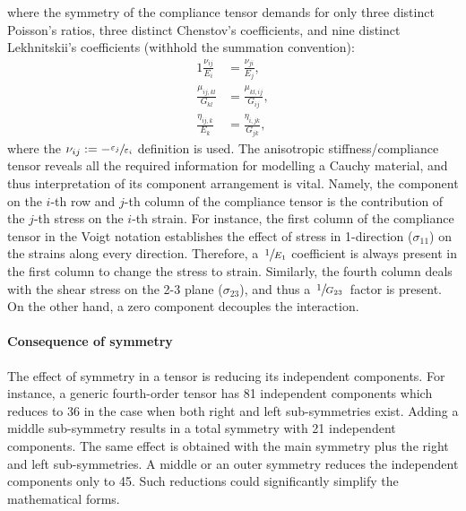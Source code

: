     where the symmetry of the compliance tensor demands for only three distinct Poisson's ratios, three distinct Chenstov's coefficients, and nine distinct Lekhnitskii's coefficients (withhold the summation convention):
    \begin{alignat}{1}
        \frac{\nu_{ij}}{E_i}       &=\frac{\nu_{ji}}{E_j},      \\
        \frac{\mu_{ij,kl}}{G_{kl}} &=\frac{\mu_{kl,ij}}{G_{ij}},\\
        \frac{\eta_{ij,k}}{E_{k}}   &=\frac{\eta_{i,jk}}{G_{jk}}, 
    \end{alignat}
    where the $\nu_{ij}\mathrel{:=} -\sfrac{\varepsilon_j}{\varepsilon_i}$ definition is used. The anisotropic stiffness/compliance tensor reveals all the required information for modelling a Cauchy material, and thus interpretation of its component arrangement is vital. Namely, the component on the $i$-th row and $j$-th column of the compliance tensor is the contribution of the $j$-th stress on the $i$-th strain. For instance, the first column of the compliance tensor in the Voigt notation establishes the effect of stress in 1-direction ($\sigma_{11}$) on the strains along every direction. Therefore, a~$\sfrac{1}{E_1}$ coefficient is always present in the first column to change the stress to strain. Similarly, the fourth column deals with the shear stress on the 2-3 plane ($\sigma_{23}$), and thus a~$\sfrac{1}{G_{23}}$~factor is present. On the other hand, a zero component decouples the interaction.


    
	\paragraph{Consequence of symmetry} The effect of symmetry in a tensor is reducing its independent components. For instance, a generic fourth-order tensor has 81 independent components which reduces to 36 in the case when both right and left sub-symmetries exist. Adding a middle sub-symmetry results in a total symmetry with 21 independent components. The same effect is obtained with the main symmetry plus the right and left sub-symmetries. A middle or an outer symmetry reduces the independent components only to 45. Such reductions could significantly simplify the mathematical forms.
    

